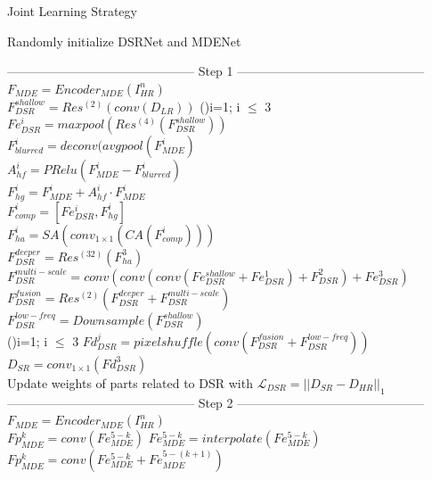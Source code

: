 \documentclass{bjtu-bachelor-thesis}
\begin{document}
\begin{adjustbox}{height=\the\paperheight-19cm,width=0.8\linewidth} 
\begin{algorithm}[H]
        \caption{Joint Learning Strategy}
        \LinesNumbered
        Randomly initialize DSRNet and MDENet\\
       
        {
         ——————————————— Step 1 ———————————————\\
        $F_{MDE}=Encoder_{MDE}(I_{HR}^n)$\\
        $F_{DSR}^{shallow}=Res^{(2)}(conv(D_{LR}))$ 
        \For(){i=1; i $\leq$ 3} 
        {
        {
        $Fe_{DSR}^i=maxpool(Res^{(4)}(F_{DSR}^{shallow}))$\\
        }
        $F_{blurred}^i=deconv(avgpool(F_{MDE}^i)$\\
        $A_{hf}^i=PRelu(F_{MDE}^i-F_{blurred}^i)$\\
        $F_{hg}^i=F_{MDE}^i+A_{hf}^i\cdot F_{MDE}^i$\\
        $F_{comp}^i=[Fe_{DSR}^i,F_{hg}^i]$\\
        $F_{ha}^i=SA(conv_{1\times 1}(CA(F_{comp}^i)))$\\
        }
        $F_{DSR}^{deeper}=Res^{(32)}(F_{ha}^3)$\\
        $F_{DSR}^{multi-scale}=conv(conv(conv(Fe_{DSR}^{shallow}+Fe_{DSR}^1)+F_{DSR}^2)+Fe_{DSR}^3)$
        $F_{DSR}^{fusion}=Res^{(2)}(F_{DSR}^{deeper}+F_{DSR}^{multi-scale})$\\
        $F_{DSR}^{low-freq}=Downsample(F_{DSR}^{shallow})$\\
        \For(){i=1; i $\leq$ 3} 
        {
        {
        $Fd_{DSR}^j=pixelshuffle(conv(F_{DSR}^{fusion}+F_{DSR}^{low-freq}))$\\
        }
        }
        $D_{SR}=conv_{1 \times 1}(Fd_{DSR}^3)$\\
        Update weights of parts related to DSR with $\mathcal{L}_{DSR}=||D_{SR}-D_{HR}||_1$\\
        ——————————————— Step 2 ———————————————\\
        $F_{MDE}=Encoder_{MDE}(I_{HR}^n)$\\
        {
        {
        $Fp_{MDE}^k=conv(Fe_{MDE}^{5-k})$
        }
        \Else
        {
        $Fe_{MDE}^{5-k}=interpolate(Fe_{MDE}^{5-k})$\\
        $Fp_{MDE}^k= conv(Fe_{MDE}^{5-k} +Fe_{MDE}^{5-(k+1)})$
        }
        }
         
}
\end{algorithm}
\end{adjustbox}
\end{document}

